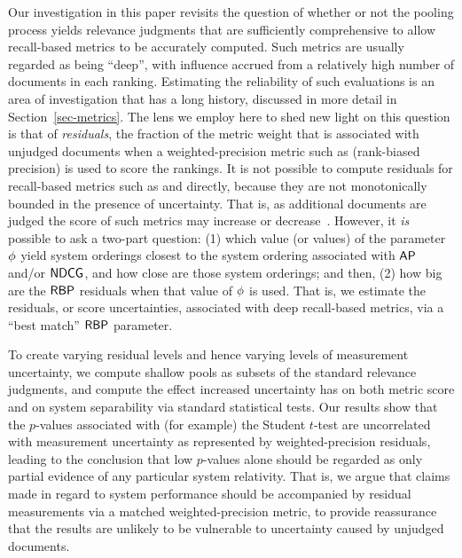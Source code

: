 Our investigation in this paper revisits the question of whether or
not the pooling process yields relevance judgments that are
sufficiently comprehensive to allow recall-based metrics to be
accurately computed.
Such metrics are usually regarded as being ``deep'', with influence
accrued from a relatively high number of documents in each ranking.
Estimating the reliability of such evaluations is an area of
investigation that has a long history, discussed in more detail in
Section~\ref{sec-metrics}.
The lens we employ here to shed new light on this question is that of
{\emph{residuals}}, the fraction of the metric weight that is
associated with unjudged documents when a weighted-precision metric
such as {\rbp} (rank-biased precision) {\citep{mz08acmtois}} is used
to score the rankings.
It is not possible to compute residuals for recall-based metrics such
as {\ap} and {\ndcg} directly, because they are not monotonically
bounded in the presence of uncertainty. That is, as additional documents are
judged the score of such metrics may increase or
decrease~\citep{mz08acmtois}.
However, it {\emph{is}} possible to ask a two-part question: (1)
which value (or values) of the {\rbp} parameter $\mbox{$\phi$}$ yield system
orderings closest to the system ordering associated with ${\mbox{\sf{AP}}}$ and/or
${\mbox{\sf{NDCG}}}$, and how close are those system orderings; and then, (2) how
big are the ${\mbox{\sf{RBP}}}$ residuals when that value of $\mbox{$\phi$}$ is used.
That is, we estimate the residuals, or score uncertainties,
associated with deep recall-based metrics, via a ``best match''
${\mbox{\sf{RBP}}}$ parameter.

To create varying residual levels and hence varying levels of
measurement uncertainty, we compute shallow pools as subsets of the
standard relevance judgments, and compute the effect increased
uncertainty has on both metric score and on system separability via
standard statistical tests.
Our results show that the $p$-values associated with (for example)
the Student $t$-test are uncorrelated with measurement uncertainty as
represented by weighted-precision residuals, leading to the
conclusion that low $p$-values alone should be regarded as only
partial evidence of any particular system relativity.
That is, we argue that claims made in regard to system performance
should be accompanied by residual measurements via a matched
weighted-precision metric, to provide reassurance that the results
are unlikely to be vulnerable to uncertainty caused by unjudged
documents.
